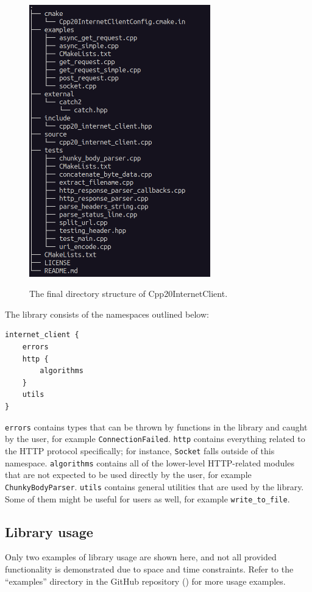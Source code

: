 \documentclass[12pt, a4paper]{article}
\begin{document}
\begin{figure}[hp]
	\centering
	\caption{The final directory structure of Cpp20InternetClient.}
	\includegraphics[width=0.7\textwidth]{directory_structure}
	\label{fig:directory_structure}
\end{figure}

The library consists of the namespaces outlined below:

\begin{verbatim}
internet_client {
    errors
    http {
        algorithms
    }
    utils
}	
\end{verbatim}

\texttt{errors} contains types that can be thrown by functions in the library and caught by the user, for example \texttt{ConnectionFailed}. \texttt{http} contains everything related to the HTTP protocol specifically; for instance, \texttt{Socket} falls outside of this namespace. \texttt{algorithms} contains all of the lower-level HTTP-related modules that are not expected to be used directly by the user, for example \texttt{ChunkyBodyParser}. \texttt{utils} contains general utilities that are used by the library. Some of them might be useful for users as well, for example \texttt{write\_to\_file}.
\subsection{Library usage}
Only two examples of library usage are shown here, and not all provided functionality is demonstrated due to space and time constraints. Refer to the “examples” directory in the GitHub repository (\cite{Cpp20InternetClient}) for more usage examples.
\end{document}
